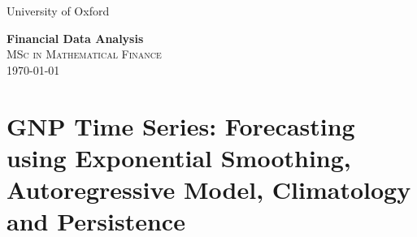 \documentclass{article}
\begin{document}
\begin{titlepage}
\vspace*{5 cm}

\centering
{\LARGE  University of Oxford\par}
\vspace*{3 cm}

{\Huge \bf Financial Data Analysis}\\[0.2\baselineskip]

\vspace*{2\baselineskip}
\scshape
 MSc in Mathematical Finance\\
\today\par
\vspace*{2\baselineskip}
\vfill
\end{titlepage}

\section*{GNP Time Series: Forecasting using Exponential Smoothing, Autoregressive Model, Climatology and Persistence}
\end{document}
